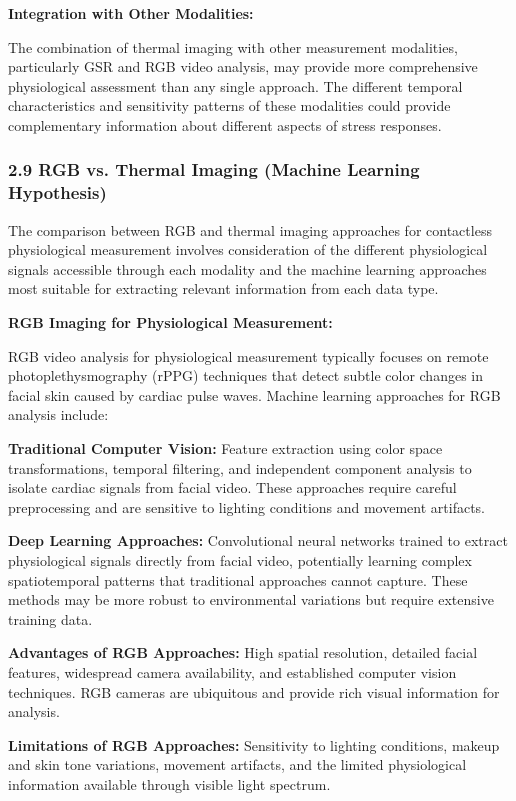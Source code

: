 \documentclass[12pt,a4paper]{report}
\begin{document}
\textbf{Integration with Other Modalities:}

The combination of thermal imaging with other measurement modalities, particularly GSR and RGB video analysis, may
provide more comprehensive physiological assessment than any single approach. The different temporal characteristics and
sensitivity patterns of these modalities could provide complementary information about different aspects of stress
responses.

\subsubsection{2.9 RGB vs. Thermal Imaging (Machine Learning Hypothesis)}

The comparison between RGB and thermal imaging approaches for contactless physiological measurement involves
consideration of the different physiological signals accessible through each modality and the machine learning
approaches most suitable for extracting relevant information from each data type.

\textbf{RGB Imaging for Physiological Measurement:}

RGB video analysis for physiological measurement typically focuses on remote photoplethysmography (rPPG) techniques that
detect subtle color changes in facial skin caused by cardiac pulse waves. Machine learning approaches for RGB analysis
include:

\textbf{Traditional Computer Vision:} Feature extraction using color space transformations, temporal filtering, and
independent component analysis to isolate cardiac signals from facial video. These approaches require careful
preprocessing and are sensitive to lighting conditions and movement artifacts.

\textbf{Deep Learning Approaches:} Convolutional neural networks trained to extract physiological signals directly from
facial video, potentially learning complex spatiotemporal patterns that traditional approaches cannot capture. These
methods may be more robust to environmental variations but require extensive training data.

\textbf{Advantages of RGB Approaches:} High spatial resolution, detailed facial features, widespread camera availability, and
established computer vision techniques. RGB cameras are ubiquitous and provide rich visual information for analysis.

\textbf{Limitations of RGB Approaches:} Sensitivity to lighting conditions, makeup and skin tone variations, movement
artifacts, and the limited physiological information available through visible light spectrum.
\end{document}
